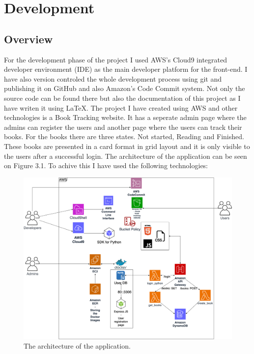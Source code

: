 \documentclass[11pt,a4paper,oneside]{report}
\begin{document}
\chapter{Development}

\section{Overview}
For the development phase of the project I used AWS's Cloud9 integrated developer environment (IDE) as the main developer platform for the front-end.
I have also version controled the whole development process using git and publishing it on GitHub and also Amazon's Code Commit system. Not only the source code can be found there but also the documentation of this project as I have writen it using \LaTeX{}.
The project I have created using AWS and other technologies is a Book Tracking website. It has a seperate admin page where the admins can register the users and another page where the users can track their books.
For the books there are three states. Not started, Reading and Finished. These books are presented in a card format in grid layout and it is only visible to the users after a successful login. The architecture of the application can be seen on Figure 3.1.
To achive this I have used the following technologies:

\begin{figure}[!ht]
  \centering
  \includegraphics[scale=0.23]{aws.drawio.png}
  \caption{The architecture of the application.}
  \label{fig:TexnicCenter}
\end{figure}
\end{document}
